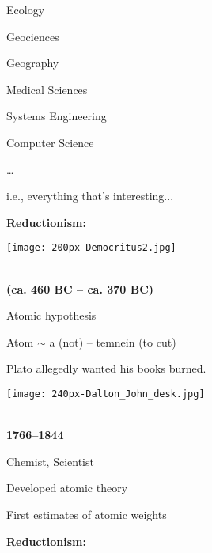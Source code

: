         Ecology
       
        Geociences
       
        Geography
      
      
      
      
       
        Medical Sciences
       
        Systems Engineering
       
        Computer Science
       
      \ldots
      
      

  
  
    i.e., everything that's interesting...
  


  \textbf{Reductionism:}

      
    
\begin{marginfigure}[]
\texttt{[image: 200px-Democritus2.jpg]}\\
\end{marginfigure}

    
    \textbf{
    \\
    (ca. 460 BC -- ca. 370 BC)
  }
    
     
      Atomic hypothesis
     
      Atom $\sim$ a (not) -- temnein (to cut)
     
      Plato allegedly wanted his books burned.
    
    
  
  \medskip

      
    
\begin{marginfigure}[]
\texttt{[image: 240px-Dalton\_John\_desk.jpg]}\\
\end{marginfigure}

    
    \textbf{
        \\
        1766--1844
      }
      
     
      Chemist, Scientist
     
      Developed atomic theory
     
      First estimates of atomic weights
    
    
  

  \textbf{Reductionism:}

